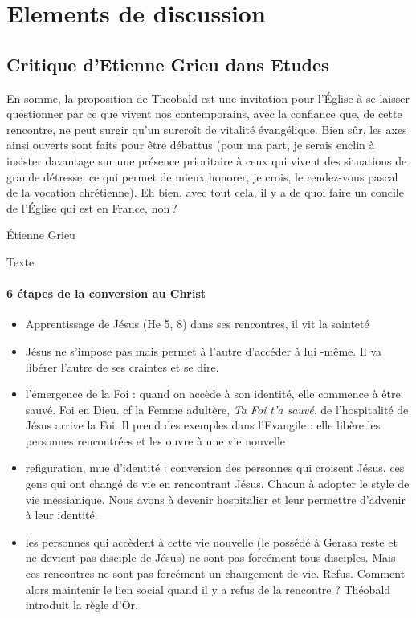 \section{ Elements de discussion}

\subsection{Critique d'Etienne Grieu dans Etudes }


En somme, la proposition de Theobald est une invitation pour l’Église à se laisser questionner par ce que vivent nos contemporains, avec la confiance que, de cette rencontre, ne peut surgir qu’un surcroît de vitalité évangélique. Bien sûr, les axes ainsi ouverts sont faits pour être débattus (pour ma part, je serais enclin à insister davantage sur une présence prioritaire à ceux qui vivent des situations de grande détresse, ce qui permet de mieux honorer, je crois, le rendez-vous pascal de la vocation chrétienne). Eh bien, avec tout cela, il y a de quoi faire un concile de l’Église qui est en France, non ?

Étienne Grieu



 \begin{comments}
 Texte
   
 \end{comments}


\paragraph{6 étapes de la conversion au Christ}
\begin{itemize}
    \item Apprentissage de Jésus (He 5, 8) dans ses rencontres, il vit la sainteté

\item Jésus ne s'impose pas mais permet à l'autre d'accéder à lui -même. Il va libérer l'autre de ses craintes et se dire. 
\item l'émergence de la Foi : quand on accède à son identité, elle commence à être sauvé. Foi en Dieu. cf la Femme adultère, \textit{Ta Foi t'a sauvé}. de l'hospitalité de Jésus arrive la Foi. Il prend des exemples dans l'Evangile : elle libère les personnes rencontrées et les ouvre à une vie nouvelle
\item refiguration, mue d'identité : conversion des personnes qui croisent Jésus, ces gens qui ont changé de vie en rencontrant Jésus. Chacun à adopter le style de vie messianique. Nous avons à devenir hospitalier et leur permettre d'advenir à leur identité.
\item les personnes qui accèdent à cette vie nouvelle ({le possédé à Gerasa reste et ne devient pas disciple de Jésus}) ne sont pas forcément tous disciples. Mais ces rencontres ne sont pas forcément un changement de vie. Refus. Comment alors maintenir le lien social quand il y a refus de la rencontre ? 
Théobald introduit la règle d'Or.
\end{itemize}
 


